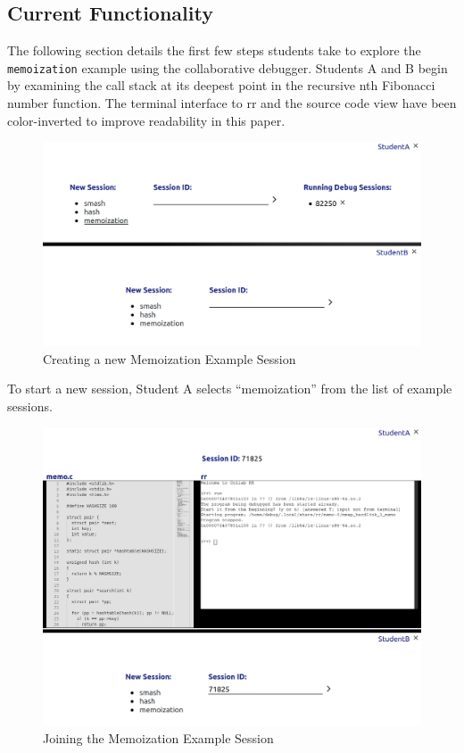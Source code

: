\documentclass[12pt]{article}
\begin{document}
\subsection{Current Functionality} \label{current}

The following section details the first few steps students take to
explore the \lstinline{memoization} example using the collaborative
debugger.  Students A and B begin by examining the call stack at its
deepest point in the recursive nth Fibonacci number function.  The
terminal interface to rr and the source code view have been
color-inverted to improve readability in this paper.

\begin{figure}[h!]

  \includegraphics[width=\textwidth]{session1i}
  \centering
  \caption{Creating a new Memoization Example Session}
  \label{session1i}
\end{figure}

To start a new session, Student A selects ``memoization'' from the
list of example sessions.\pagebreak

\begin{figure}[h!]

  \includegraphics[width=\textwidth]{session2i}
  \centering
  \caption{Joining the Memoization Example Session}
  \label{session2i}
\end{figure}
\end{document}
